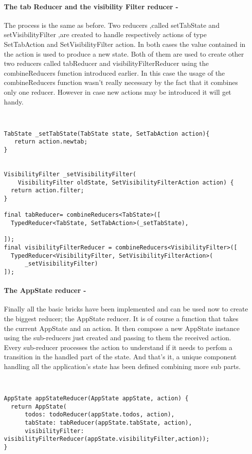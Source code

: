 \paragraph{The tab Reducer and the visibility Filter reducer - }
\label{subpar:todo_app_bloc_core_state}
The process is the same as before. Two reducers ,called setTabState and setVisibilityFilter ,are created to handle respectively actions of type SetTabAction and SetVisibilityFilter action. In both cases the value contained in the action is used to produce a new state. Both of them are used to create other two reducers called tabReducer and visibilityFilterReducer using the combineReducers function introduced earlier. In this case the usage of the combineReducers function wasn’t really necessary by the fact that it combines only one reducer. However in case new actions may be introduced it will get handy.
\begin{code}
\mbox{}\\
 \mbox{}
		\label{code:2.14}
\begin{verbatim}
TabState _setTabState(TabState state, SetTabAction action){
   return action.newtab;
}


VisibilityFilter _setVisibilityFilter(
    VisibilityFilter oldState, SetVisibilityFilterAction action) {
  return action.filter;
}

final tabReducer= combineReducers<TabState>([
  TypedReducer<TabState, SetTabAction>(_setTabState),

]);
final visibilityFilterReducer = combineReducers<VisibilityFilter>([
  TypedReducer<VisibilityFilter, SetVisibilityFilterAction>(
      _setVisibilityFilter)
]);
\end{verbatim}
\mbox{}
\end{code}

\paragraph{The AppState reducer - }
\label{subpar:todo_app_bloc_core_state}
Finally all the basic bricks have been implemented and can be used now to create the biggest reducer; the AppState reducer. It is of course a function that takes the current AppState and an action. It then compose a new AppState instance using the sub-reducers just created and passing to them the received action. Every sub-reducer processes the action to understand if it needs to perfom a transition in the handled part of the state. And that’s it, a unique component handling all the application’s state has been defined combining more sub parts.
\begin{code}
\mbox{}\\
 \mbox{}
		\label{code:2.14}
\begin{verbatim}
AppState appStateReducer(AppState appState, action) {
  return AppState(
      todos: todoReducer(appState.todos, action),
      tabState: tabReducer(appState.tabState, action),
      visibilityFilter: visibilityFilterReducer(appState.visibilityFilter,action));
}
\end{verbatim}
\mbox{}
\end{code}

